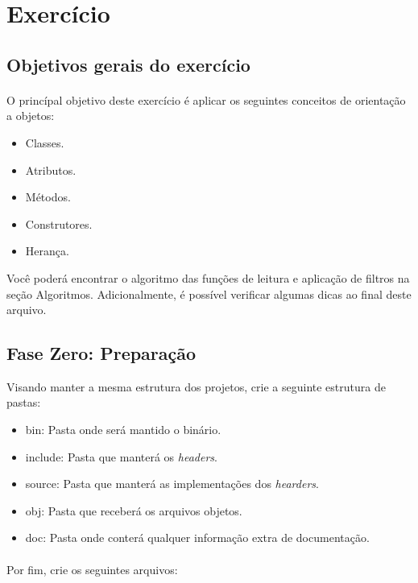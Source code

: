 \documentclass[a4paper,10pt]{article}
\begin{document}
\section{Exercício}

\subsection{Objetivos gerais do exercício}
\paragraph{}
O princípal objetivo deste exercício é aplicar os seguintes conceitos de 
orientação a objetos:

\begin{itemize}
  \item Classes.
  \item Atributos.
  \item Métodos.
  \item Construtores.
  \item Herança.
\end{itemize}

Você poderá encontrar o algoritmo das funções de leitura e aplicação de filtros
na seção Algoritmos. Adicionalmente, é possível verificar algumas dicas ao
final deste arquivo.

\subsection{Fase Zero: Preparação}

Visando manter a mesma estrutura dos projetos, crie a seguinte estrutura de
pastas:

\begin{itemize}
  \item bin: Pasta onde será mantido o binário.
  \item include: Pasta que manterá os \textit{headers}.
  \item source: Pasta que manterá as implementações dos \textit{hearders}.
  \item obj: Pasta que receberá os arquivos objetos.
  \item doc: Pasta onde conterá qualquer informação extra de documentação.
\end{itemize}

\paragraph{}
Por fim, crie os seguintes arquivos:
\end{document}
